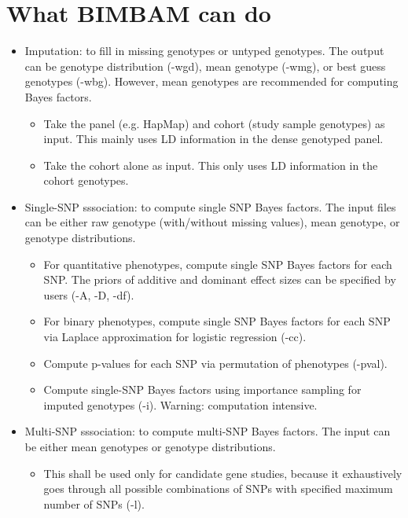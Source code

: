 \documentclass[11pt,Palatino]{article}
\begin{document}
\section*{What BIMBAM can do}
\begin{itemize}
\itemsep -0.05in
\item {\sc Imputation:} to fill in missing genotypes or untyped genotypes. The output can be genotype distribution (-wgd), mean genotype (-wmg), or best guess genotypes (-wbg). However, mean genotypes are recommended for computing Bayes factors.
\begin{itemize}
\itemsep -0.02in
\item Take the panel (e.g. HapMap) and cohort (study sample genotypes) as input. This mainly uses LD information in the dense genotyped panel.
\item Take the cohort alone as input. This only uses LD information in the cohort genotypes.

\end{itemize}
\item {\sc Single-SNP sssociation:} to compute single SNP Bayes factors.
The input files can be either raw genotype (with/without missing values), mean genotype, or genotype distributions.  
\begin{itemize}
\itemsep -0.02in
\item For quantitative phenotypes, compute single SNP Bayes factors for each SNP.  The priors of additive and dominant effect sizes can be specified by users (-A, -D, -df).
\item For binary phenotypes, compute single SNP Bayes factors for each SNP via Laplace approximation for logistic regression (-cc).  
\item Compute p-values for each SNP via permutation of phenotypes (-pval).
\item Compute single-SNP Bayes factors using importance sampling for imputed genotypes (-i). Warning: computation intensive.
\end{itemize}
\item {\sc Multi-SNP sssociation:} to compute multi-SNP Bayes factors.
The input can be either mean genotypes or genotype distributions.
\begin{itemize}
\itemsep -0.02in
\item This shall be used only for candidate gene studies, because it exhaustively goes through all possible combinations of SNPs with specified maximum number of SNPs (-l).  
\end{itemize}


\end{itemize}
\end{document}

